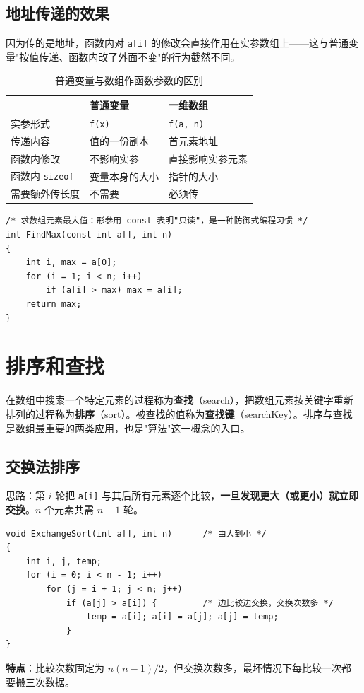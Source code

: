 \subsection{地址传递的效果}
因为传的是地址，函数内对 \texttt{a[i]} 的修改会直接作用在实参数组上——这与普通变量"按值传递、函数内改了外面不变"的行为截然不同。

\begin{table}[htbp]
\centering
\caption{普通变量与数组作函数参数的区别}
\footnotesize
\begin{tabularx}{\textwidth}{@{}p{2.6cm}p{4.2cm}X@{}}
\toprule
 & 普通变量 & 一维数组 \\
\midrule
实参形式 & \texttt{f(x)} & \texttt{f(a, n)} \\
传递内容 & 值的一份副本 & 首元素地址 \\
函数内修改 & 不影响实参 & 直接影响实参元素 \\
函数内 \texttt{sizeof} & 变量本身的大小 & 指针的大小 \\
需要额外传长度 & 不需要 & 必须传 \\
\bottomrule
\end{tabularx}
\end{table}

\begin{lstlisting}
/* 求数组元素最大值：形参用 const 表明"只读"，是一种防御式编程习惯 */
int FindMax(const int a[], int n)
{
    int i, max = a[0];
    for (i = 1; i < n; i++)
        if (a[i] > max) max = a[i];
    return max;
}
\end{lstlisting}

\section{排序和查找}
在数组中搜索一个特定元素的过程称为\textbf{查找}（search），把数组元素按关键字重新排列的过程称为\textbf{排序}（sort）。被查找的值称为\textbf{查找键}（searchKey）。排序与查找是数组最重要的两类应用，也是"算法"这一概念的入口。

\subsection{交换法排序}
思路：第 $i$ 轮把 \texttt{a[i]} 与其后所有元素逐个比较，\textbf{一旦发现更大（或更小）就立即交换}。$n$ 个元素共需 $n-1$ 轮。
\begin{lstlisting}
void ExchangeSort(int a[], int n)      /* 由大到小 */
{
    int i, j, temp;
    for (i = 0; i < n - 1; i++)
        for (j = i + 1; j < n; j++)
            if (a[j] > a[i]) {         /* 边比较边交换，交换次数多 */
                temp = a[i]; a[i] = a[j]; a[j] = temp;
            }
}
\end{lstlisting}
\textbf{特点}：比较次数固定为 $n(n-1)/2$，但交换次数多，最坏情况下每比较一次都要搬三次数据。

